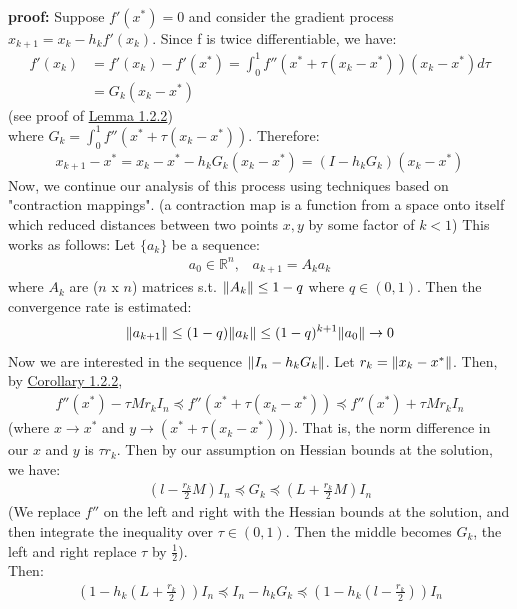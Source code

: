 \documentclass[12pt,a4paper]{article}
\begin{document}
	\textbf{proof:} Suppose $f'(x^*) = 0$ and consider the gradient process $x_{k+1} = x_k - h_kf'(x_k)$. Since f is twice differentiable, we have:
	\begin{align*}
		f'(x_k) &= f'(x_k) - f'(x^*) = \int_{0}^{1}f''(x^* + \tau(x_k - x^*))(x_k - x^*)d\tau \\
		&= G_k(x_k - x^*)
	\end{align*}
	(see proof of \hyperref[lem122]{Lemma 1.2.2})\\
	where $G_k = \int_{0}^{1}f''(x^* + \tau(x_k - x^*)) $. Therefore:
	\begin{align*}
		x_{k+1} - x^* = x_k - x^* - h_kG_k(x_k - x^*) = (I - h_kG_k)(x_k-x^*)
	\end{align*}
	Now, we continue our analysis of this process using techniques based on "contraction mappings". (a contraction map is a function from a space onto itself which reduced distances between two points $x,y$ by some factor of $k < 1$)
	This works as follows: Let $\{a_k\}$ be a sequence:
	\begin{align*}
		a_0 \in \mathbb{R}^n, \hspace{10pt}a_{k+1} = A_ka_k
	\end{align*}
	where $A_k$ are ($n$ x $n$) matrices s.t. $\norm{A_k} \leq 1-q$ where $q \in (0,1)$. Then the convergence rate is estimated:
	\begin{align*}
		\norm{a_{k+1}} \leq (1-q)\norm{a_k}\leq (1-q)^{k+1}\norm{a_0} \rightarrow 0
	\end{align*}
	Now we are interested in the sequence $\norm{I_n - h_kG_k}$. Let $r_k = \norm{x_k - x^*}$. Then, by \hyperref[cor122]{Corollary 1.2.2}, 
	\begin{align*}
		f''(x^*) - \tau Mr_kI_n \preceq f''(x^* + \tau(x_k - x^*)) \preceq f''(x^*) + \tau Mr_kI_n
	\end{align*}
	(where $ x \rightarrow x^*$ and $y \rightarrow (x^* + \tau(x_k - x^*))$). That is, the norm difference in our $x$ and $y$ is $\tau r_k$. 
	Then by our assumption on Hessian bounds at the solution, we have:
	\begin{align*}
		(l - \frac{r_k}{2}M)I_n \preceq G_k \preceq (L+\frac{r_k}{2}M)I_n
	\end{align*}
	(We replace $f''$  on the left and right with the Hessian bounds at the solution, and then integrate the inequality over $\tau \in (0,1)$. Then the middle becomes $G_k$, the left and right replace $\tau$ by $\frac{1}{2}$). \\
	Then:
	\begin{align*}
		(1 - h_k(L+ \frac{r_k}{2}))I_n \preceq I_n - h_kG_k \preceq (1 - h_k(l - \frac{r_k}{2}))I_n
	\end{align*}
\end{document}
